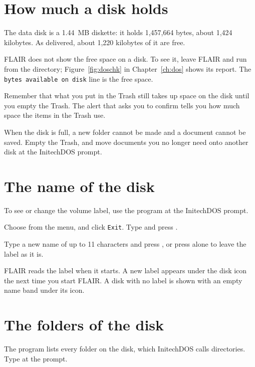 \section{How much a disk holds}
The data disk is a 1.44~MB diskette: it holds 1,457,664 bytes, about 1,424
kilobytes.  As delivered, about 1,220 kilobytes of it are free.

FLAIR does not show the free space on a disk.  To see it, leave FLAIR and
run  from the  directory; Figure~\ref{fig:doschk} in
Chapter~\ref{ch:dos} shows its report.  The \texttt{bytes available on disk}
line is the free space.

Remember that what you put in the Trash still takes up space on the disk
until you empty the Trash.  The alert that asks you to confirm
 tells you how much space the items in the Trash use.

When the disk is full, a new folder cannot be made and a document cannot
be saved.  Empty the Trash, and move documents you no longer need onto
another disk at the InitechDOS prompt.

\section{The name of the disk}
To see or change the volume label, use the  program at the
InitechDOS prompt.
\begin{TaskSteps}
\Step Choose  from the  menu,
and click \texttt{Exit}.
\Step Type  and press .
\end{TaskSteps}


\begin{TaskSteps}[resume]
\Step Type a new name of up to 11 characters and press , or
press  alone to leave the label as it is.
\end{TaskSteps}
FLAIR reads the label when it starts.  A new label appears under the disk
icon the next time you start FLAIR.  A disk with no label is shown with an
empty name band under its icon.

\section{The folders of the disk}
The  program lists every folder on the disk, which InitechDOS
calls directories.  Type  at the prompt.

